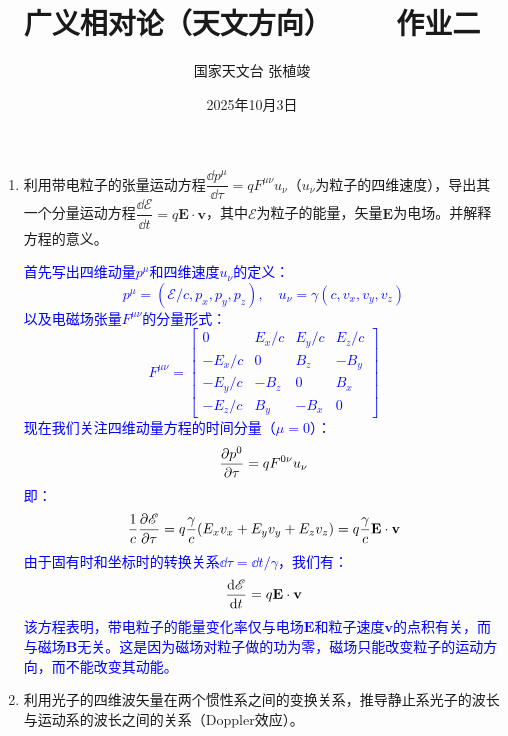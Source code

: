 \documentclass[a4paper]{article}
\title{\textbf{广义相对论（天文方向）\ \ \ \ 作业二}}
\author{国家天文台 张植竣}
\date{2025年10月3日}
\begin{document}
\maketitle

\begin{enumerate}
    \item 利用带电粒子的张量运动方程$\dfrac{\dd{p^\mu}}{\dd{\tau}} = qF^{\mu\nu} u_\nu$（$u_\nu$为粒子的四维速度），导出其一个分量运动方程$\dfrac{\dd{\mathscr{E}}}{\dd{t}} = q\mathbf{E} \cdot \mathbf{v}$，其中$\mathscr{E}$为粒子的能量，矢量$\mathbf{E}$为电场。并解释方程的意义。

    \textcolor{blue}{
        首先写出四维动量$p^\mu$和四维速度$u_\nu$的定义：
        \[
            p^\mu = (\mathscr{E}/c, p_x, p_y, p_z),\quad u_\nu = \gamma(c, v_x, v_y, v_z)
        \]
        以及电磁场张量$F^{\mu\nu}$的分量形式：
        \[
            F^{\mu\nu} =
            \begin{bmatrix}
            0 & E_x/c & E_y/c & E_z/c \\
            -E_x/c & 0 & B_z & -B_y \\
            -E_y/c & -B_z & 0 & B_x \\
            -E_z/c & B_y & -B_x & 0
            \end{bmatrix}
        \]
        现在我们关注四维动量方程的时间分量（$\mu = 0$）：
        \[
            \pdv{p^0}{\tau} = qF^{0\nu} u_\nu
        \]
        即：
        \[
            \frac{1}{c} \pdv{\mathscr{E}}{\tau} = q \frac{\gamma}{c} \qty(E_x v_x + E_y v_y + E_z v_z) = q \frac{\gamma}{c} \mathbf{E} \cdot \mathbf{v}
        \]
        由于固有时和坐标时的转换关系$\dd{\tau} = \dd{t}/\gamma$，我们有：
        \[
            \dv{\mathscr{E}}{t} = q \mathbf{E} \cdot \mathbf{v}
        \]
        该方程表明，带电粒子的能量变化率仅与电场$\mathbf{E}$和粒子速度$\mathbf{v}$的点积有关，而与磁场$\mathbf{B}$无关。这是因为磁场对粒子做的功为零，磁场只能改变粒子的运动方向，而不能改变其动能。
    }

    \item 利用光子的四维波矢量在两个惯性系之间的变换关系，推导静止系光子的波长与运动系的波长之间的关系（Doppler效应）。


\end{enumerate}
\end{document}
